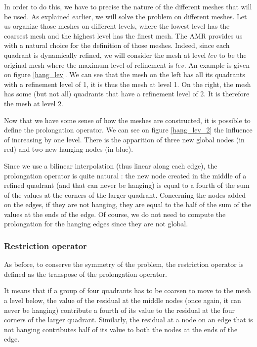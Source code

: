 In order to do this, we have to precise the nature of the different meshes that will be used. As explained earlier, we will solve the problem on different meshes. Let us organize those meshes on different levels, where the lowest level has the coarsest mesh and the highest level has the finest mesh.  The AMR provides us with a natural choice for the definition of those meshes. Indeed, since each quadrant is dynamically refined, we will consider the mesh at level $lev$ to be the original mesh where the maximum level of refinement is $lev$. An example is given on figure \ref{hang_lev}. We can see that the mesh on the left has all its quadrants with a refinement level of 1, it is thus the mesh at level 1. On the right, the mesh has some (but not all) quadrants that have a refinement level of 2. It is therefore the mesh at level 2. 

Now that we have some sense of how the meshes are constructed, it is possible to define the prolongation operator. We can see on figure \ref{hang_lev_2} the influence of increasing by one level. There is the apparition of three new global nodes (in red) and two new hanging nodes (in blue).

Since we use a bilinear interpolation (thus linear along each edge), the prolongation operator is quite natural : the new node created in the middle of a refined quadrant (and that can never be hanging) is equal to a fourth of the sum of the values at the corners of the larger quadrant. Concerning the nodes added on the edges, if they are not hanging, they are equal to the half of the sum of the values at the ends of the edge. Of course, we do not need to compute the prolongation for the hanging edges since they are not global. 

\subsubsection{Restriction operator}

As before, to conserve the symmetry of the problem, the restriction operator is defined as the transpose of the prolongation operator. 

It means that if a group of four quadrants has to be coarsen to move to the mesh a level below, the value of the residual at the middle nodes (once again, it can never be hanging) contribute a fourth of its value to the residual at the four corners of the larger quadrant. Similarly, the residual at a node on an edge that is not hanging contributes half of its value to both the nodes at the ends of the edge. 

